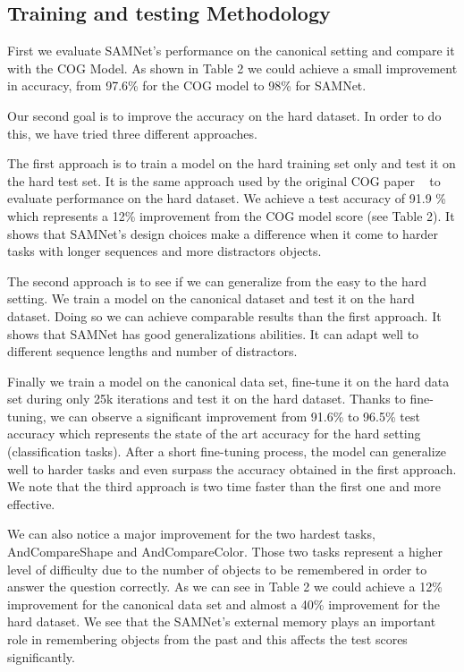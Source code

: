 \subsection{Training and testing Methodology}

First we evaluate SAMNet's performance on the canonical setting and compare it with the COG Model. As shown in Table 2 we could achieve a small improvement in accuracy, from 97.6\% for the COG model to 98\% for SAMNet.

Our second goal is to improve the accuracy on the hard dataset. In order to do this, we have tried three different approaches.

The first approach is to train a model on the hard training set only and test it on the hard test set. It is the same approach used by the original COG paper ~\cite{yang2018dataset} to evaluate performance on the hard dataset. We achieve a test accuracy of 91.9 \% which represents a 12\% improvement from the COG model score (see Table 2).
It shows that SAMNet's design choices make a difference when it come to harder tasks with longer sequences and more distractors objects.

The second approach is to see if we can generalize from the easy to the hard setting. We train a model on the canonical dataset and test it on the hard dataset. Doing so we can achieve comparable results than the first approach. It shows that SAMNet has good generalizations abilities. It can adapt well to different sequence lengths and number of distractors.

Finally we train a model on the canonical data set, fine-tune it on the hard data set during only 25k iterations and test it on the hard dataset. Thanks to fine-tuning, we can observe a significant improvement from 91.6\%  to 96.5\% test accuracy which represents the state of the art accuracy for the hard setting (classification tasks).
After a short fine-tuning process, the model can generalize well to harder tasks and even surpass the accuracy obtained in the first approach. We note that the third approach is two time faster than the first one and more effective.


We can also notice a major improvement for the two hardest tasks, AndCompareShape and AndCompareColor. Those two tasks represent a higher level of difficulty due to the number of objects to be remembered in order to answer the question correctly.
As we can see in Table 2 we could achieve a 12\% improvement for the canonical data set and almost a 40\% improvement for the hard dataset.
We see that the SAMNet's external memory plays an important role in remembering objects from the past and this affects the test scores significantly. 






